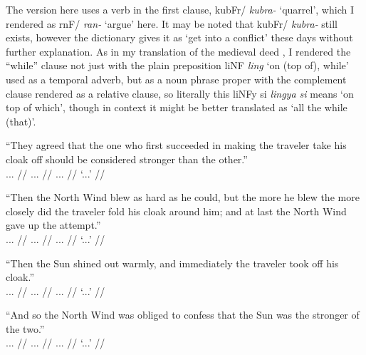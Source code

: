 \documentclass[12pt,paper=a4]{scrartcl}
\newcommand{\ayr}[1]{{\Tagati #1}}
\newcommand{\xayr}[3]{{\Tagati #1} \emph{#2} \enquote*{#3}}
\begin{document}
The \citeyear{becker2004} version here uses a verb in the first clause, \xayr{kubFr/}{kubra-}{quarrel}, which I rendered as \xayr{rnF/}{ran-}{argue} here. It may be noted that \ayr{kubFr/} \textit{kubra-} still exists, however the dictionary gives it as `get into a conflict' these days without further explanation. As in my translation of the medieval deed \autocite[9]{becker2015}, I rendered the \enquote{while} clause not just with the plain preposition \xayr{liNF}{ling}{on (top of), while} used as a temporal adverb, but as a noun phrase proper with the complement clause rendered as a relative clause, so literally this \ayr{liNFy si} \textit{lingya si} means `on top of which', though in context it might be better translated as `all the while (that)'.

\ex %
\begingl
	\glpreamble \enquote{They agreed that the one who first succeeded in making the traveler take his cloak off should be considered stronger than the other.}\\
		... //
	\gla ... //
	\glb ... //
	\glft `...' //
\endgl
\xe

\ex %
\begingl
	\glpreamble \enquote{Then the North Wind blew as hard as he could, but the more he blew the more closely did the traveler fold his cloak around him; and at last the North Wind gave up the attempt.}\\
		... //
	\gla ... //
	\glb ... //
	\glft `...' //
\endgl
\xe

\ex %
\begingl
	\glpreamble \enquote{Then the Sun shined out warmly, and immediately the traveler took off his cloak.}\\
		... //
	\gla ... //
	\glb ... //
	\glft `...' //
\endgl
\xe

\ex %
\begingl
	\glpreamble \enquote{And so the North Wind was obliged to confess that the Sun was the stronger of the two.}\\
		... //
	\gla ... //
	\glb ... //
	\glft `...' //
\endgl
\xe


\pagebreak

\begin{multicols}{3}
\printglossary[style=mysuper,type=\leipzigtype]
\end{multicols}

\printbibliography[heading=bibintoc]
\end{document}
